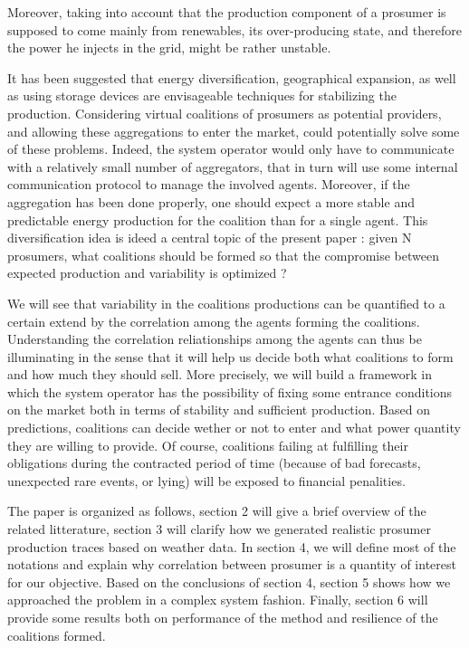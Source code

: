 \documentclass[conference]{IEEEtran}
\begin{document}
Moreover, taking into account that the production component of a prosumer is supposed to come mainly from renewables, its over-producing state, and therefore the power he injects in the grid, might be rather unstable.

It has been suggested that energy diversification, geographical expansion, as well as using storage devices are envisageable techniques for  stabilizing the production. Considering virtual coalitions of prosumers as potential providers, and allowing these aggregations to enter the market, could potentially solve some of these problems. Indeed, the system operator would only have to communicate with a relatively small number of aggregators, that in turn will use some internal communication protocol to manage the involved agents. Moreover, if the aggregation has been done properly, one should expect a more stable and predictable energy production for the coalition than for a single agent. This diversification idea is ideed a central topic of the present paper : given N prosumers, what coalitions should be formed so that the compromise between expected production and variability is optimized ?

We will see that variability in the coalitions productions can be quantified to a certain extend by the correlation among the agents forming the coalitions. Understanding the correlation reliationships among the agents can thus be illuminating in the sense that it will help us decide both what coalitions to form and how much they should sell. More precisely, we will build a framework in which the system operator has the possibility of fixing some entrance conditions on the market both in terms of stability and sufficient production. Based on predictions, coalitions can decide wether or not to enter and what power quantity they are willing to provide. Of course, coalitions failing at fulfilling their obligations during the contracted period of time (because of bad forecasts, unexpected rare events, or lying) will be exposed to financial penalities.

The paper is organized as follows, section 2 will give a brief overview of the related litterature, section 3 will clarify how we generated realistic prosumer production traces based on weather data. In section 4, we will define most of the notations and explain why correlation between prosumer is a quantity of interest for our objective. Based on the conclusions of section 4, section 5 shows how we approached the problem in a complex system fashion. Finally, section 6 will provide some results both on performance of the method and resilience of the coalitions formed.
\end{document}
